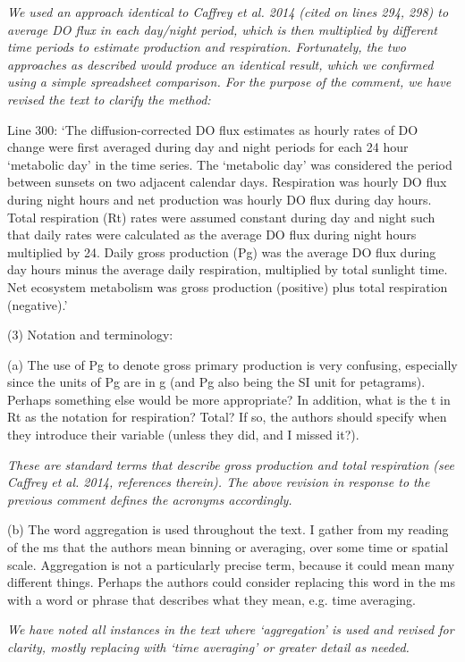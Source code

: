 \documentclass[letterpaper,12pt]{article}\usepackage[]{graphicx}\usepackage[]{color}
\begin{document}
{\it We used an approach identical to Caffrey et al. 2014 (cited on lines 294, 298) to average DO flux in each day/night period, which is then multiplied by different time periods to estimate production and respiration.  Fortunately, the two approaches as described would produce an identical result, which we confirmed using a simple spreadsheet comparison.  For the purpose of the comment, we have revised the text to clarify the method:

Line 300: `The diffusion-corrected DO flux estimates as hourly rates of DO change were first averaged during day and night periods for each 24 hour `metabolic day' in the time series. The `metabolic day' was considered the period between sunsets on two adjacent calendar days.  Respiration was hourly DO flux during night hours and net production was hourly DO flux during day hours.  Total respiration (Rt) rates were assumed constant during day and night such that daily rates were calculated as the average DO flux during night hours multiplied by 24. Daily gross production (Pg) was the average DO flux during day hours minus the average daily respiration, multiplied by total sunlight time.  Net ecosystem metabolism was gross production (positive) plus total respiration (negative).'
}

(3) Notation and terminology:

(a) The use of Pg to denote gross primary production is very confusing, especially since the units of Pg are in g (and Pg also being the SI unit for petagrams). Perhaps something else would be more appropriate? In addition, what is the t in Rt as the notation for respiration? Total? If so, the authors should specify when they introduce their variable (unless they did, and I missed it?).

{\it These are standard terms that describe gross production and total respiration (see Caffrey et al. 2014, references therein).  The above revision in response to the previous comment defines the acronyms accordingly.}

(b) The word aggregation is used throughout the text. I gather from my reading of the ms that the authors mean binning or averaging, over some time or spatial scale. Aggregation is not a particularly precise term, because it could mean many different things. Perhaps the authors could consider replacing this word in the ms with a word or phrase that describes what they mean, e.g. time averaging.

{\it We have noted all instances in the text where `aggregation' is used and revised for clarity, mostly replacing with `time averaging' or greater detail as needed.}
\end{document}

